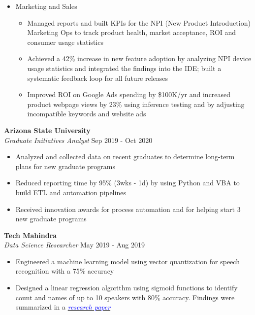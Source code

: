 \documentclass[letterpaper]{article}
\begin{document}
\begin{itemize} [itemsep=1pt, leftmargin=*]
          \vspace{-1mm}
    \item Marketing and Sales
          \vspace{-2mm}
          \begin{itemize} \itemsep 2pt
              \item Managed reports and built KPIs for the NPI (New Product Introduction) Marketing Ops to track product health, market acceptance, ROI and  consumer usage statistics
              \item Achieved a 42\% increase in new feature adoption by analyzing NPI device usage statistics and integrated the findings into the IDE; built a systematic feedback loop for all future releases
              \item Improved ROI on Google Ads spending by \$100K/yr and increased product webpage views by 23\% using inference testing and by adjusting incompatible keywords and website ads
          \end{itemize}
\end{itemize}

\textbf{Arizona State University}\\
\textit{Graduate Initiatives Analyst} \hfill Sep 2019 - Oct 2020\\
\vspace{-1mm}
\begin{itemize} [itemsep=1pt, leftmargin=*]
    \item Analyzed and collected data on recent graduates to determine long-term plans for new graduate programs
    \item Reduced reporting time by 95\% (3wks - 1d) by using Python and VBA to build ETL and automation pipelines
    \item Received innovation awards for process automation and for helping start 3 new graduate programs
\end{itemize}

\textbf{Tech Mahindra}\\
\textit{Data Science Researcher} \hfill May 2019 - Aug 2019\\
\vspace{-1mm}
\begin{itemize} [itemsep=1pt, leftmargin=*]
    \item Engineered a machine learning model using vector quantization for speech recognition with a 75\% accuracy  
    \item Designed a linear regression algorithm using sigmoid functions to identify count and names of up to 10 speakers with 80\% accuracy. Findings were summarized in a \href{https://github.com/adityamujumdar/speech-to-text-paper/blob/main/Speech-to-text%20conversion%20and%20Speaker%20Count%20extrapolation%20using%20vector%20quantization%20of%20speech%20characteristics.pdf}{\textcolor{blue}{\textit{research paper}}}
\end{itemize}
\end{document}
